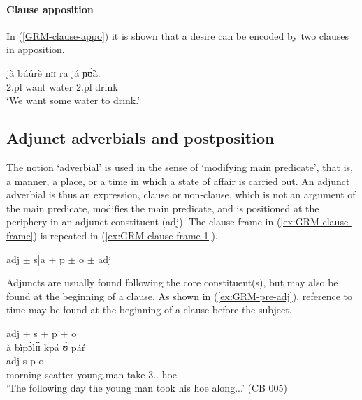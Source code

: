 \begin{exe}
\begin{exe}
  \z 
 \z






 \paragraph{Clause apposition}
 \label{GRM-dep-comp-clause}
% 
In (\ref{GRM-clause-appo}) it is shown that a desire can be
encoded by two clauses in apposition. 
% 
 \begin{exe}
 \ex\label{GRM-clause-appo}
 \gll jà búúrè nɪ̄ɪ̄ rā já ɲʊ̃́ã̀.\\
{\sc 2.pl} want water {\foc} {\sc 2.pl} drink\\
 \glt  `We want some water to drink.' 
 \z


 
 
\subsection{Adjunct adverbials and postposition}
\label{sec:GRM-adjuncts}


The notion `adverbial' is used in the sense of  `modifying main predicate', 
that 
is,  a manner, a place, or a time in which a state of affair is carried out. An 
adjunct adverbial is thus an expression, clause or non-clause, which is not an 
argument of  the main predicate,  modifies the main predicate, and is 
positioned 
at the periphery 
in 
an adjunct constituent  ({\sc adj}). The clause frame in 
(\ref{ex:GRM-clause-frame}) is repeated in (\ref{ex:GRM-clause-frame-1}). 

\begin{exe}
\ex\label{ex:GRM-clause-frame-1}
 {\sc adj}  $\pm$ {\sc s|a}  $+$ {\sc p} $\pm$ {\sc o} $\pm$ {\sc adj} 
\end{exe}



Adjuncts are usually found following the core constituent(s), but may also be
found at the beginning of a clause. As
shown in (\ref{ex:GRM-pre-adj}), 
reference to time may be found at the beginning of a clause before 
the 
subject.


\ea\label{ex:GRM-pre-adj}
{{\sc adj} $+$ {\sc s}  $+$ {\sc p}  $+$  {\sc o}}\\
\glll  {[tʃʊ̀ɔ̀sá  pɪ̀sɪ̀]}   {à bìpɔ̀lɪ́ɪ̀}  kpá {ʊ̀ páŕ}\\ 
 {\sc adj}  {\sc s}  {\sc p} {\sc o}\\
{morning   scatter}   {{\art} young.man} take {{3.\sg.\poss} hoe}\\
  \glt  `The following day the young man took his hoe along...' (CB 005)
\z


\end{exe}
\end{exe}
\end{exe}
